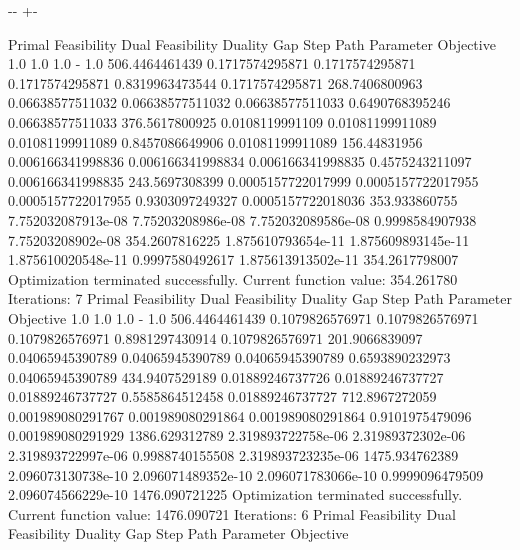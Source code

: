 \documentclass[letterpaper,10pt,english]{sphinxmanual}
\newlength\nbsphinxcodecellspacing
\begin{document}
{

\kern-\sphinxverbatimsmallskipamount\kern-\baselineskip
\kern+\FrameHeightAdjust\kern-\fboxrule
\vspace{\nbsphinxcodecellspacing}

\begin{sphinxVerbatim}[commandchars=\\\{\}]
Primal Feasibility  Dual Feasibility    Duality Gap         Step             Path Parameter      Objective
1.0                 1.0                 1.0                 -                1.0                 506.4464461439
0.1717574295871     0.1717574295871     0.1717574295871     0.8319963473544  0.1717574295871     268.7406800963
0.06638577511032    0.06638577511032    0.06638577511033    0.6490768395246  0.06638577511033    376.5617800925
0.0108119991109     0.01081199911089    0.01081199911089    0.8457086649906  0.01081199911089    156.44831956
0.006166341998836   0.006166341998834   0.006166341998835   0.4575243211097  0.006166341998835   243.5697308399
0.0005157722017999  0.0005157722017955  0.0005157722017955  0.9303097249327  0.0005157722018036  353.933860755
7.752032087913e-08  7.75203208986e-08   7.752032089586e-08  0.9998584907938  7.75203208902e-08   354.2607816225
1.875610793654e-11  1.875609893145e-11  1.875610020548e-11  0.9997580492617  1.875613913502e-11  354.2617798007
Optimization terminated successfully.
         Current function value: 354.261780
         Iterations: 7
Primal Feasibility  Dual Feasibility    Duality Gap         Step             Path Parameter      Objective
1.0                 1.0                 1.0                 -                1.0                 506.4464461439
0.1079826576971     0.1079826576971     0.1079826576971     0.8981297430914  0.1079826576971     201.9066839097
0.04065945390789    0.04065945390789    0.04065945390789    0.6593890232973  0.04065945390789    434.9407529189
0.01889246737726    0.01889246737727    0.01889246737727    0.5585864512458  0.01889246737727    712.8967272059
0.001989080291767   0.001989080291864   0.001989080291864   0.9101975479096  0.001989080291929   1386.629312789
2.319893722758e-06  2.31989372302e-06   2.319893722997e-06  0.9988740155508  2.319893723235e-06  1475.934762389
2.096073130738e-10  2.096071489352e-10  2.096071783066e-10  0.9999096479509  2.096074566229e-10  1476.090721225
Optimization terminated successfully.
         Current function value: 1476.090721
         Iterations: 6
Primal Feasibility  Dual Feasibility    Duality Gap         Step             Path Parameter      Objective

\end{sphinxVerbatim}}
\end{document}
